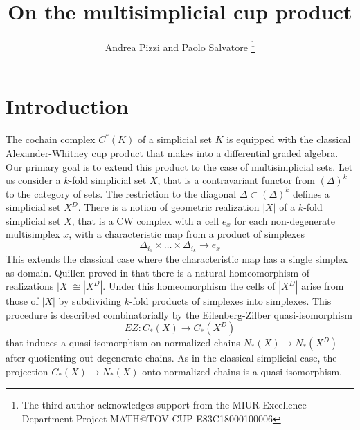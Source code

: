 \documentclass[a4paper,11pt]{article}
\theoremstyle{remark}
\theoremstyle{definition}
\begin{document}
\title{On the multisimplicial cup product}
\date{}
\author{Andrea Pizzi and Paolo Salvatore  \footnote{The third author acknowledges support from 
the MIUR Excellence Department Project MATH@TOV CUP E83C18000100006}
 }

	
\maketitle



	
\section{Introduction}

The cochain complex $C^*(K)$ of a simplicial set $K$ is equipped with the classical Alexander-Whitney cup product that makes into a
differential graded algebra.
Our primary goal is to extend this product to the case of multisimplicial sets.  Let us consider a $k$-fold simplicial set $X$, that is a contravariant functor from $(\Delta)^k$ to the category of sets. The restriction to the diagonal  $\Delta \subset (\Delta)^k$ defines a simplicial set $X^D$. There is a notion 
of geometric realization $|X|$ of a $k$-fold simplicial set $X$, that is a CW complex with a cell $e_x$ for each non-degenerate multisimplex $x$, with a characteristic map from a product of simplexes  $$\Delta_{i_1} \times \dots \times \Delta_{i_k} \to e_x$$ This extends the classical case where the characteristic map has a single simplex as domain. 
Quillen proved in 
\cite{Quillen} that there is  a natural homeomorphism of realizations $|X| \cong |X^D|$. Under this homeomorphism the cells of $|X^D|$ arise from those
of $|X|$ by subdividing $k$-fold products of simplexes into simplexes. This procedure is described combinatorially by the Eilenberg-Zilber quasi-isomorphism $$EZ:C_*(X) \to C_*(X^D)$$ that induces a quasi-isomorphism on normalized chains 
$N_*(X) \to N_*(X^D)$ after quotienting out degenerate chains.
 As in the classical simplicial case, the projection $C_*(X) \to N_*(X)$ onto normalized chains 
is a quasi-isomorphism.

\medskip
\end{document}

